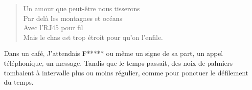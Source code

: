 \begin{verse}%
  \quatrain%
  Un amour que peut-être nous tisserons\\  %
  Par delà les montagnes et océans\\  %
  Avec l’RJ45 pour fil\\  %
  Mais le chas est trop étroit pour qu’on l’enfile.
\end{verse}

\begin{prose}
  Dans un café, J’attendais F***** ou même un signe de sa part, un appel téléphonique, un message. Tandis que le temps passait, des noix de palmiers tombaient à intervalle plus ou moins régulier, comme pour ponctuer le défilement du temps.
\end{prose}

